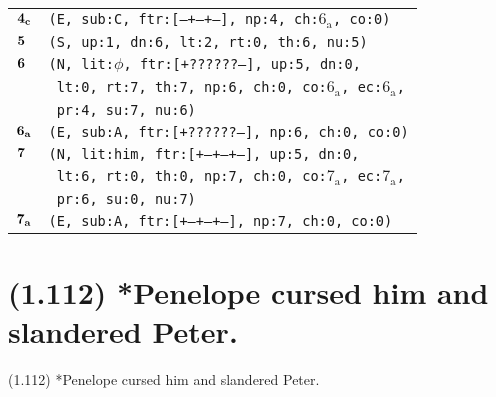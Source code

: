\documentclass{article}
\begin{document}
\begin{minipage}{\textwidth}
{\begin{tabular}{|r|l|}
    ${\textbf{\textrm{4}}_{\textbf{\textrm{c}}}}$ & \texttt{\texttt{(E,~sub:C,~ftr:[---+--+--],~np:4,~ch:${\textrm{6}_{\textrm{a}}}$,~co:0)}} \\
    ${\textbf{\textrm{5}}_{\phantom{z}}}$ & \texttt{\texttt{(S,~up:1,~dn:6,~lt:2,~rt:0,~th:6,~nu:5)}} \\
    ${\textbf{\textrm{6}}_{\phantom{z}}}$ & \texttt{\texttt{(N,~lit:$\phi$,~ftr:[+??????--],~up:5,~dn:0,}} \\
    & \texttt{\texttt{~lt:0,~rt:7,~th:7,~np:6,~ch:0,~co:${\textrm{6}_{\textrm{a}}}$,~ec:${\textrm{6}_{\textrm{a}}}$,}} \\
    & \texttt{\texttt{~pr:4,~su:7,~nu:6)}} \\
    ${\textbf{\textrm{6}}_{\textbf{\textrm{a}}}}$ & \texttt{\texttt{(E,~sub:A,~ftr:[+??????--],~np:6,~ch:0,~co:0)}} \\
    ${\textbf{\textrm{7}}_{\phantom{z}}}$ & \texttt{\texttt{(N,~lit:him,~ftr:[+--+--+--],~up:5,~dn:0,}} \\
    & \texttt{\texttt{~lt:6,~rt:0,~th:0,~np:7,~ch:0,~co:${\textrm{7}_{\textrm{a}}}$,~ec:${\textrm{7}_{\textrm{a}}}$,}} \\
    & \texttt{\texttt{~pr:6,~su:0,~nu:7)}} \\
    ${\textbf{\textrm{7}}_{\textbf{\textrm{a}}}}$ & \texttt{\texttt{(E,~sub:A,~ftr:[+--+--+--],~np:7,~ch:0,~co:0)}} \\
    \hline
  \end{tabular}
  }
\end{minipage}
\bigbreak

\clearpage

%
%

\section*{(1.112) *Penelope cursed him and slandered Peter.}

\bigbreak
\begin{enumerate*}
\item[(1.112)] *Penelope cursed him and slandered Peter.
\end{enumerate*}
\bigbreak
\end{document}
